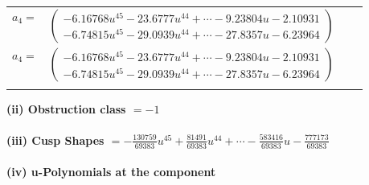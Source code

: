 \documentclass[1p]{elsarticle_modified}
\theoremstyle{definition}
\begin{document}
\begin{tabular}{m{7pt} m{180pt} m{7pt} m{180pt} }
\flushright $a_{4}=$&$\begin{pmatrix}-6.16768 u^{45}-23.6777 u^{44}+\cdots-9.23804 u-2.10931\\-6.74815 u^{45}-29.0939 u^{44}+\cdots-27.8357 u-6.23964\end{pmatrix}$\\ \flushright $a_{4}=$&$\begin{pmatrix}-6.16768 u^{45}-23.6777 u^{44}+\cdots-9.23804 u-2.10931\\-6.74815 u^{45}-29.0939 u^{44}+\cdots-27.8357 u-6.23964\end{pmatrix}$\\&\end{tabular}
\flushleft \textbf{(ii) Obstruction class $= -1$}\\~\\
\flushleft \textbf{(iii) Cusp Shapes $= -\frac{130759}{69383} u^{45}+\frac{81491}{69383} u^{44}+\cdots-\frac{583416}{69383} u-\frac{777173}{69383}$}\\~\\
\newpage\renewcommand{\arraystretch}{1}
\flushleft \textbf{(iv) u-Polynomials at the component}\newline \\
\end{document}
